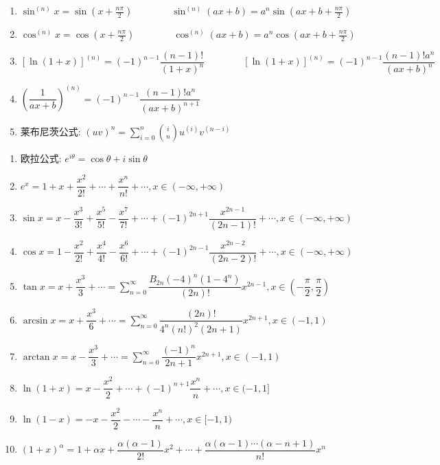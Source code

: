 \begin{theorem}[高阶导数]
	\begin{enumerate}
		\item $\sin^{(n)} x = \sin (x+\frac{n\pi}{2})\qquad \qquad\sin^{(n)}(ax+b) = a^{n} \sin(ax+b+\frac{n\pi}{2})$
		\item $\cos^{(n)} x = \cos (x+\frac{n\pi}{2})\qquad\qquad \cos^{(n)}(ax+b) = a^{n} \cos(ax+b+\frac{n\pi}{2})$
		\item $[\ln(1+x)]^{(n)} = (-1)^{n-1}\dfrac{(n-1)!}{(1+x)^{n}}\qquad\qquad [\ln(1+x)]^{(n)} = (-1)^{n-1}\dfrac{(n-1)!a^{n}}{(ax+b)^{n}}$
		\item $(\dfrac{1}{ax+b})^{(n)} = (-1)^{n-1}\dfrac{(n-1)!a^{n}}{(ax+b)^{n+1}}$
		\item 莱布尼茨公式: $(uv)^{n} = \sum\limits_{i=0}^{n}\binom{i}{n}u^{(i)}v^{(n-i)}$

	\end{enumerate}
\end{theorem}

\begin{theorem}[泰勒公式]
	\begin{enumerate}
		\item 欧拉公式: $e^{i\theta}=\cos \theta+i\sin\theta$
		\item $e^{x}=1+x+\dfrac{x^{2}}{2!}+\cdots+\dfrac{x^{n}}{n!}+\cdots, x\in(-\infty,+\infty)$
		\item $\sin x = x-\dfrac{x^{3}}{3!}+\dfrac{x^{5}}{5!}-\dfrac{x^{7}}{7!}+\cdots+(-1)^{2n+1}\dfrac{x^{2n-1}}{(2n-1)!}+\cdots, x\in(-\infty,+\infty)$
		\item $\cos x=1-\dfrac{x^{2}}{2!}+\dfrac{x^{4}}{4!}-\dfrac{x^{6}}{6!}+\cdots+(-1)^{2n-1}\dfrac{x^{2n-2}}{(2n-2)!}+\cdots, x\in(-\infty,+\infty)$
		\item $\tan x = x+\dfrac{x^{3}}{3}+\cdots=\sum\limits_{n=0}^{\infty}\dfrac{B_{2n}(-4)^{n}(1-4^{n})}{(2n)!}x^{2n-1}, x\in(-\dfrac{\pi}{2},\dfrac{\pi}{2})$
		\item $\arcsin x = x+\dfrac{x^{3}}{6}+\cdots=\sum\limits_{n=0}^{\infty}\dfrac{(2n)!}{4^{n}(n!)^{2}(2n+1)}x^{2n+1}, x\in(-1,1)$
		\item $\arctan x = x-\dfrac{x^{3}}{3}+\cdots = \sum\limits_{n=0}^{\infty}\dfrac{(-1)^{n}}{2n+1}x^{2n+1}, x\in(-1,1)$
		\item $\ln (1+x) = x-\dfrac{x^{2}}{2}+\cdots+(-1)^{n+1}\dfrac{x^{n}}{n}+\cdots, x\in(-1,1]$
		\item $\ln (1-x) =-x-\dfrac{x^{2}}{2}-\cdots-\dfrac{x^{n}}{n}+\cdots, x\in[-1,1)$
		\item $(1+x)^{\alpha} = 1+\alpha x+\dfrac{\alpha(\alpha-1)}{2!}x^{2}+\cdots+\dfrac{\alpha(\alpha-1)\cdots(\alpha-n+1)}{n!}x^{n}$
	\end{enumerate}
\end{theorem}

